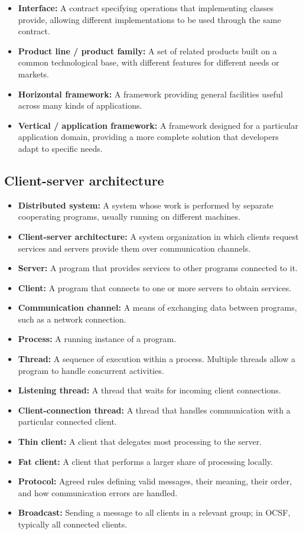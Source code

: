 \documentclass[11pt]{article}
\newenvironment{DottedList}{%
  \begin{itemize}[leftmargin=2em, itemsep=0.35em, topsep=0.35em, label=\textbullet]
}{%
  \end{itemize}
}
\begin{document}
\begin{DottedList}
  \item \textbf{Interface:} A contract specifying operations that implementing classes provide, allowing different implementations to be used through the same contract.
  \item \textbf{Product line / product family:} A set of related products built on a common technological base, with different features for different needs or markets.
  \item \textbf{Horizontal framework:} A framework providing general facilities useful across many kinds of applications.
  \item \textbf{Vertical / application framework:} A framework designed for a particular application domain, providing a more complete solution that developers adapt to specific needs.
\end{DottedList}

\subsection*{Client-server architecture}
\begin{DottedList}
  \item \textbf{Distributed system:} A system whose work is performed by separate cooperating programs, usually running on different machines.
  \item \textbf{Client-server architecture:} A system organization in which clients request services and servers provide them over communication channels.
  \item \textbf{Server:} A program that provides services to other programs connected to it.
  \item \textbf{Client:} A program that connects to one or more servers to obtain services.
  \item \textbf{Communication channel:} A means of exchanging data between programs, such as a network connection.
  \item \textbf{Process:} A running instance of a program.
  \item \textbf{Thread:} A sequence of execution within a process. Multiple threads allow a program to handle concurrent activities.
  \item \textbf{Listening thread:} A thread that waits for incoming client connections.
  \item \textbf{Client-connection thread:} A thread that handles communication with a particular connected client.
  \item \textbf{Thin client:} A client that delegates most processing to the server.
  \item \textbf{Fat client:} A client that performs a larger share of processing locally.
  \item \textbf{Protocol:} Agreed rules defining valid messages, their meaning, their order, and how communication errors are handled.
  \item \textbf{Broadcast:} Sending a message to all clients in a relevant group; in OCSF, typically all connected clients.
\end{DottedList}
\end{document}

